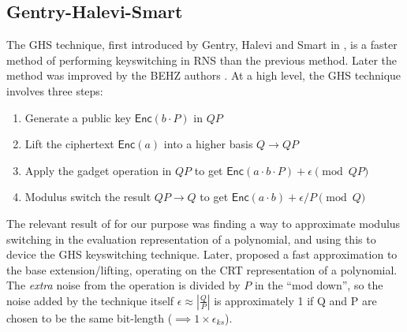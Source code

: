 
\subsection{Gentry-Halevi-Smart}
The GHS technique, first introduced by Gentry, Halevi and Smart in \autocite{cryptoeprint:2012/099}, is a faster method of performing keyswitching in RNS than the previous method. Later the method was improved by the BEHZ authors \autocite{cryptoeprint:2016/510}.
At a high level, the GHS technique involves three steps: 
\begin{enumerate}
    \item Generate a public key $\mathsf{Enc}(b\cdot P)$ in $QP$
    \item Lift the ciphertext $\mathsf{Enc}(a)$ into a higher basis $Q \to QP$
    \item Apply the gadget operation in $QP$ to get $\mathsf{Enc}(a \cdot b \cdot P) + \epsilon \pmod{QP}$
    \item Modulus switch the result $QP\to Q$ to get $\mathsf{Enc}(a \cdot b) + \epsilon/P \pmod{Q}$
\end{enumerate}

The relevant result of \autocite{cryptoeprint:2012/099} for our purpose was finding a way to approximate modulus switching in the evaluation representation of a polynomial, and using this to device the GHS keyswitching technique. Later, \autocite{cryptoeprint:2016/510} proposed a fast approximation to the base extension/lifting, operating on the CRT representation of a polynomial. The \textit{extra} noise from the operation is divided by $P$ in the ``mod down'', so the noise added by the technique itself $\epsilon\approx |\frac{Q}{P}|$ is approximately 1 if Q and P are chosen to be the same bit-length ($\implies 1\times \epsilon_{ks}$).


